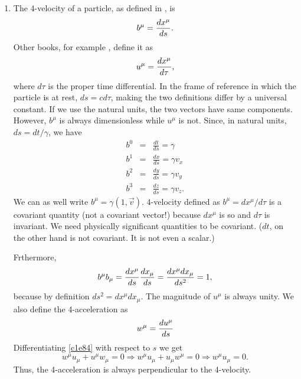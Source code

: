 \begin{enumerate}
\item The 4-velocity of a particle, as defined in \cite{ll2}, is
\begin{equation}\label{c1e78}
b^\mu = \frac{d{x^\mu}}{d{s}}.
\end{equation}
Other books, for example \cite{pg}, define it as 
\begin{equation}\label{c1e79}
u^\mu = \frac{d{x^\mu}}{d{\tau}},
\end{equation}
where $d\tau$ is the proper time differential. In the frame of reference in
which the particle is at rest, $ds = cd\tau$, making the two definitions 
differ by a universal constant. If we use the natural units, the two vectors
have same components. However, $b^\mu$ is always dimensionless while $u^\mu$
is not. Since, in natural units, $ds = dt/\gamma$, we have
\begin{eqnarray}
b^0&=&\frac{dt}{ds} = \gamma \label{c1e80}\\
b^1&=&\frac{dx}{ds} = \gamma v_x \label{c1e81} \\
b^2&=&\frac{dy}{ds} = \gamma v_y \label{c1e82} \\
b^3&=&\frac{dz}{ds} = \gamma v_z. \label{c1e83}
\end{eqnarray}
We can as well write $b^\mu = \gamma(1, \vec{v})$. 4-velocity defined as 
$b^\mu = dx^\mu/d\tau$ is a covariant quantity (not a covariant vector!) 
because $dx^\mu$ is so and $d\tau$ is invariant. We need physically significant 
quantities to be covariant. ($dt$, on the other hand is not covariant. It is 
not even a scalar.)

Frthermore,
\begin{equation}\label{c1e84}
b^\mu b_\mu = \frac{d{x^\mu}}{d{s}}\frac{d{x_\mu}}{d{s}} = \frac{dx^\mu dx_\mu}{ds^2} = 1,
\end{equation}
because by definition $ds^2 = dx^\mu dx_\mu$. The magnitude of $u^\mu$ is always
unity. We also define the 4-acceleration as
\begin{equation}\label{c1e85}
w^\mu = \frac{d{u^\mu}}{d{s}}
\end{equation}
Differentiating \eqref{c1e84} with respect to $s$ we get
\begin{equation}\label{c1e86}
w^\mu u_\mu + u^\mu w_\mu = 0 \Rightarrow w^\mu u_\mu + u_\mu w^\mu = 0 
\Rightarrow w^\mu u_\mu = 0.
\end{equation}
Thus, the 4-acceleration is always perpendicular to the 4-velocity.
\end{enumerate}

